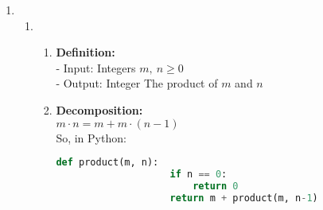 \documentclass[a4paper]{article}
\begin{document}
\begin{enumerate}
\begin{enumerate}
    \end{enumerate}

    \item \begin{enumerate}

        \item \begin{enumerate}[label=(\roman*)]
            \item \textbf{Definition:} \\
            - Input: Integers $m,\ n \ge 0$ \\
            - Output: Integer The product of $m$ and $n$ \\

            \item \textbf{Decomposition:} \\
            $m \cdot n = m + m \cdot (n-1)$ \\
            So, in Python:
            \begin{lstlisting}[language=python]
                def product(m, n):
                    if n == 0:
                        return 0
                    return m + product(m, n-1)
            \end{lstlisting}


\end{enumerate}
\end{enumerate}
\end{enumerate}
\end{document}
